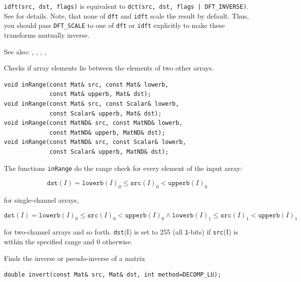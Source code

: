 \texttt{idft(src, dst, flags)} is equivalent to \texttt{dct(src, dst, flags | DFT\_INVERSE)}.
See  for details.
Note, that none of \texttt{dft} and \texttt{idft} scale the result by default.
Thus, you should pass \texttt{DFT\_SCALE} to one of \texttt{dft} or \texttt{idft}
explicitly to make these transforms mutually inverse.

See also: , , , , 


\label{inRange}
Checks if array elements lie between the elements of two other arrays.

\begin{lstlisting}
void inRange(const Mat& src, const Mat& lowerb,
             const Mat& upperb, Mat& dst);
void inRange(const Mat& src, const Scalar& lowerb,
             const Scalar& upperb, Mat& dst);
void inRange(const MatND& src, const MatND& lowerb,
             const MatND& upperb, MatND& dst);
void inRange(const MatND& src, const Scalar& lowerb,
             const Scalar& upperb, MatND& dst);
\end{lstlisting}
\begin{description}
\end{description}

The functions \texttt{inRange} do the range check for every element of the input array:

\[
\texttt{dst}(I)=\texttt{lowerb}(I)_0 \leq \texttt{src}(I)_0 < \texttt{upperb}(I)_0
\]

for single-channel arrays,

\[
\texttt{dst}(I)=
\texttt{lowerb}(I)_0 \leq \texttt{src}(I)_0 < \texttt{upperb}(I)_0 \land
\texttt{lowerb}(I)_1 \leq \texttt{src}(I)_1 < \texttt{upperb}(I)_1
\]

for two-channel arrays and so forth.
\texttt{dst}(I) is set to 255 (all \texttt{1}-bits) if \texttt{src}(I) is within the specified range and 0 otherwise.


\label{invert}
Finds the inverse or pseudo-inverse of a matrix

\begin{lstlisting}
double invert(const Mat& src, Mat& dst, int method=DECOMP_LU);
\end{lstlisting}
\begin{description}
\end{description}

